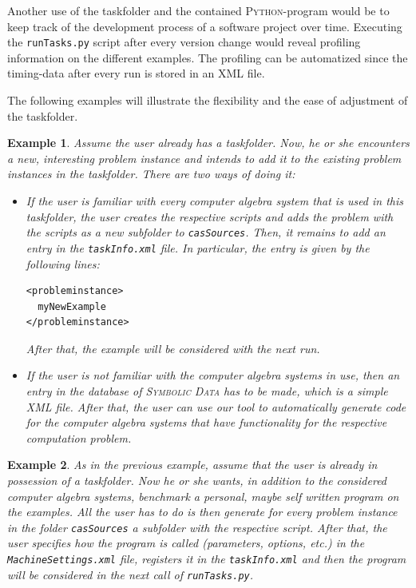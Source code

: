\documentclass[oribibl,11pt]{article}
\newtheorem{example}{Example}
\begin{document}
Another use of the taskfolder and the contained \textsc{Python}-program would be to keep track of the development process of a
software project over time. Executing the \texttt{runTasks.py} script
after every version change would reveal profiling information on the
different examples. The profiling can be automatized since the
timing-data after every run is stored in an \textsc{XML} file.

The following examples will illustrate the flexibility and the ease of
adjustment of the taskfolder.
\vspace*{-10pt}
\begin{example}
  Assume the user already has a taskfolder. Now, he or she encounters a new,
  interesting problem instance and intends to add it to the existing problem
  instances in the taskfolder. There are two ways of doing it:
  \begin{itemize}
    \item If the user is familiar with every computer algebra system
      that is used in this taskfolder, the user creates the respective
      scripts and adds the problem with the scripts as a new subfolder
      to \texttt{casSources}.
      Then, it remains to add an
      entry in the \texttt{taskInfo.xml} file. In particular, the
      entry is given by the following lines:
\begin{verbatim}
<probleminstance>
  myNewExample
</probleminstance>
\end{verbatim}
 After that, the example will be considered
      with the next run.
    \item If the user is not familiar with the computer algebra
      systems in use, then an entry in the database of
      \textsc{Symbolic Data} has to be made, which is a simple
      \textsc{XML} file. After that, the user can
      use our tool to automatically generate code for the computer
      algebra systems that have functionality for the respective
      computation problem.
  \end{itemize}
\end{example}
\vspace*{-10pt}
\begin{example}
  As in the previous example, assume that the user is already in
  possession of a taskfolder. Now he or she  wants, in
  addition to the considered computer algebra systems, benchmark a personal,
  maybe self written program on the examples. All the user has to do
  is then generate for every problem instance in the folder
  \texttt{casSources} a subfolder with the respective script. After that, the user specifies how the program is called
  (parameters, options, etc.) in the \texttt{MachineSettings.xml} file,
  registers it in the \texttt{taskInfo.xml}
  and then the program will be considered in the next call of
  \texttt{runTasks.py}.
\end{example}
\end{document}
